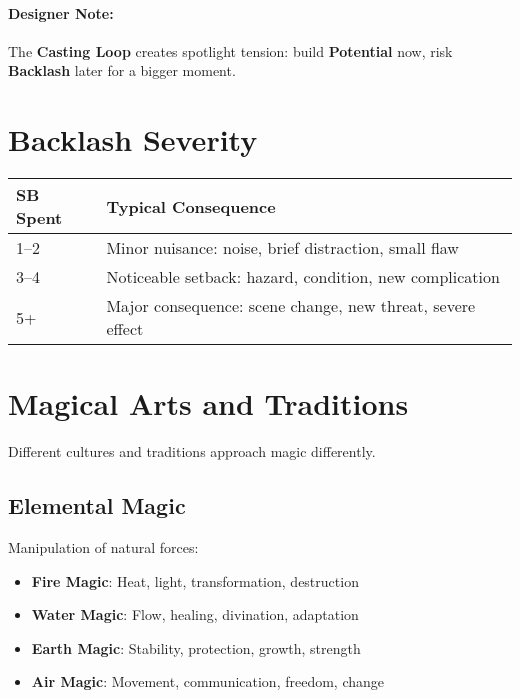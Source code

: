 \begin{multicols}{2}
\paragraph{Designer Note:}
The \textbf{Casting Loop} creates spotlight tension: build \textbf{Potential} now, risk \textbf{Backlash} later for a bigger moment.

\section{Backlash Severity} 

\begin{center}
\small
\begin{tabular}{ll}
\toprule
\textbf{SB Spent} & \textbf{Typical Consequence} \\
\midrule
1--2 & Minor nuisance: noise, brief distraction, small flaw \\
3--4 & Noticeable setback: hazard, condition, new complication \\
5+   & Major consequence: scene change, new threat, severe effect \\
\bottomrule
\end{tabular}
\end{center}

\section{Magical Arts and Traditions} 

Different cultures and traditions approach magic differently.

\subsection*{Elemental Magic} 
Manipulation of natural forces:
\begin{itemize}
\item \textbf{Fire Magic}: Heat, light, transformation, destruction
\item \textbf{Water Magic}: Flow, healing, divination, adaptation
\item \textbf{Earth Magic}: Stability, protection, growth, strength
\item \textbf{Air Magic}: Movement, communication, freedom, change
\end{itemize}


\end{multicols}
